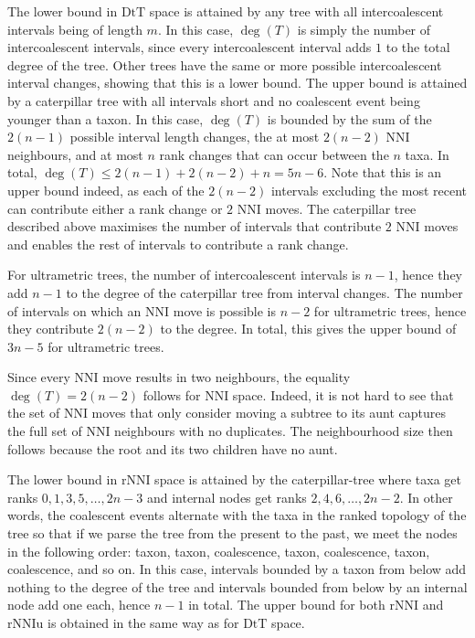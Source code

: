 \documentclass{amsart}
\newcommand{\nni}{\mathrm{NNI}}
\newcommand{\rnni}{\mathrm{rNNI}}
\newcommand{\rnniu}{\mathrm{rNNIu}}
\newcommand{\mdts}{\mathrm{DtT}}
\begin{document}
\proof
The lower bound in $\mdts$ space is attained by any tree with all intercoalescent intervals being of length $m$.
In this case, $\deg(T)$ is simply the number of intercoalescent intervals, since every intercoalescent interval adds $1$ to the total degree of the tree.
Other trees have the same or more possible intercoalescent interval changes, showing that this is a lower bound.
The upper bound is attained by a caterpillar tree with all intervals short and no coalescent event being younger than a taxon.
In this case, $\deg(T)$ is bounded by the sum of the $2(n-1)$ possible interval length changes, the at most $2(n-2)$ NNI neighbours, and at most $n$ rank changes that can occur between the $n$ taxa.
In total, $\deg(T) \le 2(n-1) + 2(n-2) + n = 5n-6$.
Note that this is an upper bound indeed, as each of the $2(n-2)$ intervals excluding the most recent can contribute either a rank change or $2$ NNI moves.
The caterpillar tree described above maximises the number of intervals that contribute $2$ NNI moves and enables the rest of intervals to contribute a rank change.

For ultrametric trees, the number of intercoalescent intervals is $n-1$, hence they add $n-1$ to the degree of the caterpillar tree from interval changes.
The number of intervals on which an NNI move is possible is $n-2$ for ultrametric trees, hence they contribute $2(n-2)$ to the degree.
In total, this gives the upper bound of $3n-5$ for ultrametric trees.

Since every NNI move results in two neighbours, the equality $\deg(T) = 2(n-2)$ follows for $\nni$ space.
Indeed, it is not hard to see that the set of NNI moves that only consider moving a subtree to its aunt captures the full set of NNI neighbours with no duplicates.
The neighbourhood size then follows because the root and its two children have no aunt.

The lower bound in $\rnni$ space is attained by the caterpillar-tree where taxa get ranks $0, 1, 3, 5, \ldots, 2n-3$ and internal nodes get ranks $2, 4, 6, \ldots, 2n-2$.
In other words, the coalescent events alternate with the taxa in the ranked topology of the tree so that if we parse the tree from the present to the past, we meet the nodes in the following order: taxon, taxon, coalescence, taxon, coalescence, taxon, coalescence, and so on.
In this case, intervals bounded by a taxon from below add nothing to the degree of the tree and intervals bounded from below by an internal node add one each, hence $n-1$ in total.
The upper bound for both $\rnni$ and $\rnniu$ is obtained in the same way as for $\mdts$ space.
\end{document}
